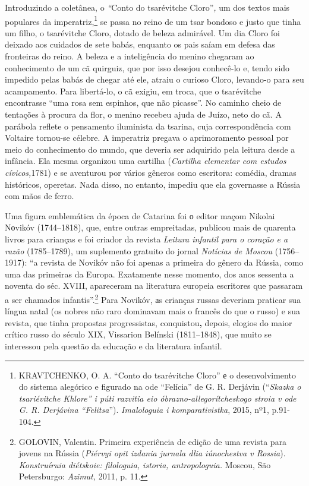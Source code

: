 Introduzindo a coletânea, o \emph{``}Conto do tsarévitche
Cloro''\emph{,} um dos textos mais populares da imperatriz,\footnote{KRAVTCHENKO,
  O. A. ``Conto do tsarévitche Cloro'' е o desenvolvimento do sistema
  alegórico e figurado na ode ``Felícia'' de G. R. Derjávin
  (``\emph{Skazka o tsariévitche Khlore'' i púti razvitia eio
  óbrazno-allegorítcheskogo stroia v ode G. R. Derjávina ``Felitsa}'').
  \emph{Imalologuia i komparativistka}, 2015, nº1, p.91-104.} se passa
no reino de um tsar bondoso e justo que tinha um filho, o tsarévitche
Cloro, dotado de beleza admirável. Um dia Cloro foi deixado aos cuidados
de sete babás, enquanto os pais saíam em defesa das fronteiras do reino.
A beleza e a inteligência do menino chegaram ao conhecimento de um cã
quirguiz, que por isso desejou conhecê-lo e, tendo sido impedido pelas
babás de chegar até ele, atraiu o curioso Cloro, levando-o para seu
acampamento. Para libertá-lo, o cã exigiu, em troca, que o tsarévitche
encontrasse ``uma rosa sem espinhos, que não picasse''. No caminho cheio
de tentações à procura da flor, o menino recebeu ajuda de Juízo, neto do
cã. A parábola reflete o pensamento iluminista da tsarina, cuja
correspondência com Voltaire tornou-se célebre. A imperatriz pregava o
aprimoramento pessoal por meio do conhecimento do mundo, que deveria ser
adquirido pela leitura desde a infância. Ela mesma organizou uma
cartilha (\emph{Cartilha elementar com estudos cívicos,}1781) e se
aventurou por vários gêneros como escritora: comédia, dramas históricos,
operetas. Nada disso, no entanto, impediu que ela governasse a Rússia
com mãos de ferro.

Uma figura emblemática da época de Catarina foi о editor maçom Nikolai
Nоvikóv (1744--1818), que, entre outras empreitadas, publicou mais de
quarenta livros para crianças e foi criador da revista \emph{Leitura
infantil para o coração e a razão} (1785--1789), um suplemento gratuito
do jornal \emph{Notícias de Moscou} (1756--1917): ``a revista de Novikóv
não foi apenas a primeira do gênero da Rússia, como uma das primeiras da
Europa. Exatamente nesse momento, dos anos sessenta a noventa do séc.
XVIII, apareceram na literatura europeia escritores que passaram a ser
chamados infantis''.\footnote{GOLOVIN, Valentin. Primeira experiência de
  edição de uma revista para jovens na Rússia (\emph{Piérvyi opit
  izdania jurnala dlia iúnochestva v Rossia}). \emph{Konstruíruia
  diétskoie: filologuia, istoria, antropologuia.} Moscou, São
  Petersburgo: \emph{Azimut,} 2011, p. 11.} Para Novikóv, аs crianças
russas deveriam praticar sua língua natal (os nobres não raro dominavam
mais o francês do que o russo) e sua revista, que tinha propostas
progressistas, conquistou\textbf{,} depois, elogios do maior crítico
russo do século XIX, Vissarion Belínski (1811--1848), que muito se
interessou pela questão da educação e da literatura infantil.

